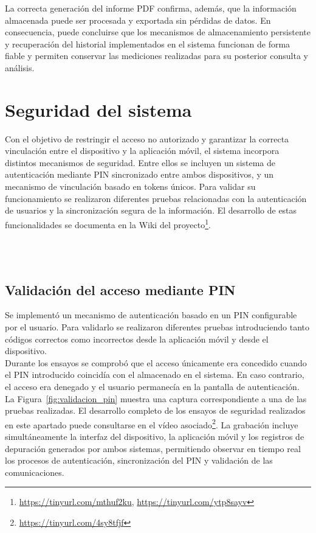 La correcta generación del informe PDF confirma, además, que la información almacenada puede ser procesada y exportada sin pérdidas de datos. En consecuencia, puede concluirse que los mecanismos de almacenamiento persistente y recuperación del historial implementados en el sistema funcionan de forma fiable y permiten conservar las mediciones realizadas para su posterior consulta y análisis.

\section{Seguridad del sistema}

Con el objetivo de restringir el acceso no autorizado y garantizar la correcta vinculación entre el dispositivo y la aplicación móvil, el sistema incorpora distintos mecanismos de seguridad. Entre ellos se incluyen un sistema de autenticación mediante PIN sincronizado entre ambos dispositivos, y un mecanismo de vinculación basado en tokens únicos. Para validar su funcionamiento se realizaron diferentes pruebas relacionadas con la autenticación de usuarios y la sincronización segura de la información. El desarrollo de estas funcionalidades se documenta en la Wiki del proyecto\footnote{\url{https://tinyurl.com/mthuf2ku}, \url{https://tinyurl.com/ytp8sayv}}.\\

\

\

\subsection{Validación del acceso mediante PIN}

Se implementó un mecanismo de autenticación basado en un PIN configurable por el usuario. Para validarlo se realizaron diferentes pruebas introduciendo tanto códigos correctos como incorrectos desde la aplicación móvil y desde el dispositivo.\\

Durante los ensayos se comprobó que el acceso únicamente era concedido cuando el PIN introducido coincidía con el almacenado en el sistema. En caso contrario, el acceso era denegado y el usuario permanecía en la pantalla de autenticación.\\

La Figura~\ref{fig:validacion_pin} muestra una captura correspondiente a una de las pruebas realizadas. El desarrollo completo de los ensayos de seguridad realizados en este apartado puede consultarse en el vídeo asociado\footnote{\url{https://tinyurl.com/4sy8tfjf}}. La grabación incluye simultáneamente la interfaz del dispositivo, la aplicación móvil y los registros de depuración generados por ambos sistemas, permitiendo observar en tiempo real los procesos de autenticación, sincronización del PIN y validación de las comunicaciones.

